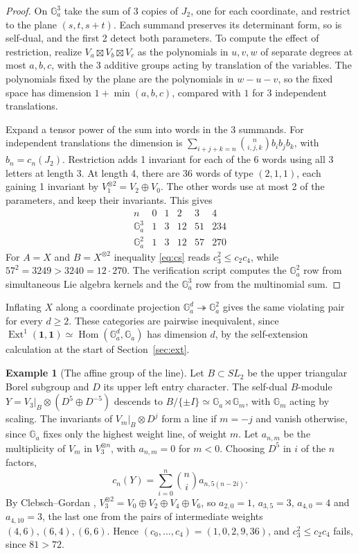 \documentclass[11pt,reqno]{amsart}
\theoremstyle{definition}
\newtheorem{example}[theorem]{Example}
\newcommand{\Hom}{\operatorname{Hom}}
\newcommand{\Ext}{\operatorname{Ext}}
\newcommand{\one}{\mathbf 1}
\newcommand{\Ga}{\mathbb G_a}
\newcommand{\Gm}{\mathbb G_m}
\begin{document}
\begin{proof}
On $\Ga^3$ take the sum of 3 copies of $J_2$, one for each coordinate, and restrict to the plane $(s,t,s+t)$. Each summand preserves its determinant form, so is self-dual, and the first 2 detect both parameters. To compute the effect of restriction, realize $V_a\boxtimes V_b\boxtimes V_c$ as the polynomials in $u,v,w$ of separate degrees at most $a,b,c$, with the 3 additive groups acting by translation of the variables. The polynomials fixed by the plane are the polynomials in $w-u-v$, so the fixed space has dimension $1+\min(a,b,c)$, compared with $1$ for 3 independent translations.

Expand a tensor power of the sum into words in the 3 summands. For independent translations the dimension is $\sum_{i+j+k=n}\binom{n}{i,j,k}b_ib_jb_k$, with $b_n=c_n(J_2)$. Restriction adds 1 invariant for each of the 6 words using all 3 letters at length 3. At length 4, there are 36 words of type $(2,1,1)$, each gaining 1 invariant by $V_1^{\otimes2}=V_2\oplus V_0$. The other words use at most 2 of the parameters, and keep their invariants. This gives
\[
\begin{array}{c|rrrrr}
n&0&1&2&3&4\\ \hline
\Ga^3&1&3&12&51&234\\
\Ga^2&1&3&12&57&270
\end{array}
\]
For $A=X$ and $B=X^{\otimes2}$ inequality \eqref{eq:cs} reads $c_3^2\leq c_2c_4$, while $57^2=3249>3240=12\cdot270$. The verification script computes the $\Ga^2$ row from simultaneous Lie algebra kernels and the $\Ga^3$ row from the multinomial sum.
\end{proof}

Inflating $X$ along a coordinate projection $\Ga^d\twoheadrightarrow\Ga^2$ gives the same violating pair for every $d\geq2$. These categories are pairwise inequivalent, since $\Ext^1(\one,\one)\simeq\Hom(\Ga^d,\Ga)$ has dimension $d$, by the self-extension calculation at the start of Section~\ref{sec:ext}.

\begin{example}[The affine group of the line]\label{ex:affine}
Let $B\subset SL_2$ be the upper triangular Borel subgroup and $D$ its upper left entry character. The self-dual $B$-module $Y=V_3|_B\otimes(D^5\oplus D^{-5})$ descends to $B/\{\pm I\}\simeq\Ga\rtimes\Gm$, with $\Gm$ acting by scaling. The invariants of $V_m|_B\otimes D^j$ form a line if $m=-j$ and vanish otherwise, since $\Ga$ fixes only the highest weight line, of weight $m$. Let $a_{n,m}$ be the multiplicity of $V_m$ in $V_3^{\otimes n}$, with $a_{n,m}=0$ for $m<0$. Choosing $D^5$ in $i$ of the $n$ factors,
\[
 c_n(Y)=\sum_{i=0}^n\binom ni a_{n,5(n-2i)} .
\]
By Clebsch--Gordan \cite[Example~4.9.3]{EGNO}, $V_3^{\otimes2}=V_0\oplus V_2\oplus V_4\oplus V_6$, so $a_{2,0}=1$, $a_{3,5}=3$, $a_{4,0}=4$ and $a_{4,10}=3$, the last one from the pairs of intermediate weights $(4,6),(6,4),(6,6)$. Hence $(c_0,\ldots,c_4)=(1,0,2,9,36)$, and $c_3^2\leq c_2c_4$ fails, since $81>72$.
\end{example}
\end{document}
